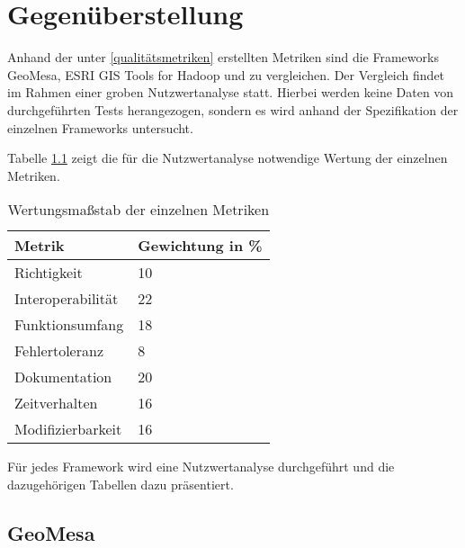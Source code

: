 \chapter{Gegenüberstellung}

Anhand der unter \ref{qualitätsmetriken} erstellten Metriken sind die Frameworks GeoMesa, ESRI GIS Tools for Hadoop und  zu vergleichen.
Der Vergleich findet im Rahmen einer groben Nutzwertanalyse statt.
Hierbei werden keine Daten von durchgeführten Tests herangezogen, sondern es wird anhand der Spezifikation der einzelnen Frameworks untersucht.


Tabelle \ref{table:Wertungsmassstab} zeigt die für die Nutzwertanalyse notwendige Wertung der einzelnen Metriken.
\begin{table}[h]
\centering
\begin{tabular}{l|l}
\textbf{Metrik} & \textbf{Gewichtung in \%} \\ \hline
Richtigkeit & 10 \\ \hline
Interoperabilität & 22 \\ \hline
Funktionsumfang & 18 \\ \hline
Fehlertoleranz & 8 \\ \hline
Dokumentation & 20 \\ \hline
Zeitverhalten & 16 \\ \hline
Modifizierbarkeit & 16
\end{tabular}
\caption{Wertungsmaßstab der einzelnen Metriken}
\label{table:Wertungsmassstab}
\end{table}

Für jedes Framework wird eine Nutzwertanalyse durchgeführt und die dazugehörigen Tabellen dazu präsentiert.

\section{GeoMesa}

